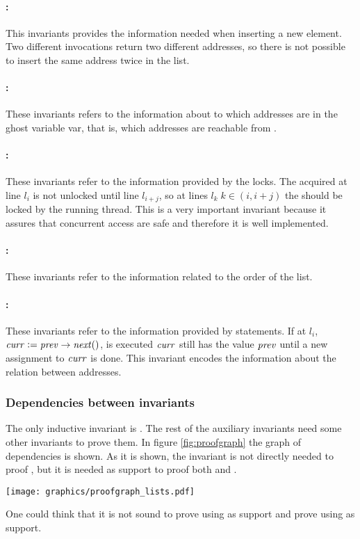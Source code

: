 \paragraph{\invDisjoint:}
This invariants provides the information needed when inserting a new element.
%
Two different \fMalloc invocations return two different addresses, so there is not possible to insert the same address twice in the list.
%
\paragraph{\invRegion:}
These invariants refers to the information about to which addresses are in the ghost variable \region var, that is, which addresses are reachable from \head.
%
\paragraph{\invLock:}
These invariants refer to the information provided by the locks. 
%
The \fLock acquired at line $l_i$ is not unlocked until line $l_{i+j}$, so at lines $l_{k}\; k\in(i,i+j)$ the \fLock should be locked by the running thread.
%
This is a very important invariant because it assures that concurrent access are safe and therefore it is well implemented.
%
\paragraph{\invOrder:}
These invariants refer to the information related to the order of the list. 
%
\paragraph{\invNext:}
These invariants refer to the information provided by \fNext statements. 
%
If at $l_i$, $\mathit{curr} := \mathit{prev}\to\mathit{next}()$, is executed $\mathit{curr}$ still has the value $\mathit{prev}$ until a new assignment to $\mathit{curr}$ is done.
%
This invariant encodes the information about the relation between addresses.

\subsubsection{Dependencies between invariants}
The only inductive invariant is \invOrder. 
%
The rest of the auxiliary invariants need some other invariants to prove them.
%
In figure \ref{fig:proofgraph} the graph of dependencies is shown.
%
As it is shown, the invariant \invDisjoint is not directly needed to proof \invPreserve, but it is needed as support to proof both \invNext and \invRegion. 

\begin{center}
\texttt{[image: graphics/proofgraph\_lists.pdf]}
\label{fig:proofgraph}
\end{center}

One could think that it is not sound to prove \invLock using \invRegion as support and prove \invRegion using \invLock as support.
%
